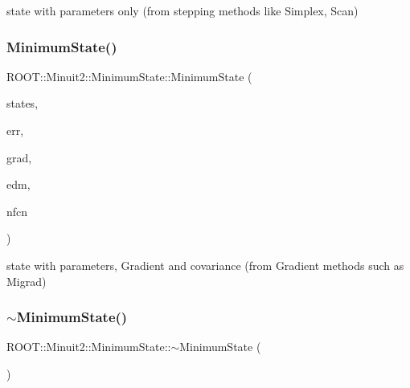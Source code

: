 state with parameters only (from stepping methods like Simplex, Scan) \mbox{\label{classROOT_1_1Minuit2_1_1MinimumState_a35c2e0098d60a9caeee9e2c60093b5a9}} 
\subsubsection{\texorpdfstring{MinimumState()}{MinimumState()}\hspace{0.1cm}{\footnotesize\ttfamily [3/8]}}
{\footnotesize\ttfamily R\+O\+O\+T\+::\+Minuit2\+::\+Minimum\+State\+::\+Minimum\+State (\begin{DoxyParamCaption}\item[{const \mbox{\hyperlink{classROOT_1_1Minuit2_1_1MinimumParameters}{Minimum\+Parameters}} \&}]{states,  }\item[{const \mbox{\hyperlink{classROOT_1_1Minuit2_1_1MinimumError}{Minimum\+Error}} \&}]{err,  }\item[{const \mbox{\hyperlink{classROOT_1_1Minuit2_1_1FunctionGradient}{Function\+Gradient}} \&}]{grad,  }\item[{double}]{edm,  }\item[{int}]{nfcn }\end{DoxyParamCaption})\hspace{0.3cm}{\ttfamily [inline]}}

state with parameters, Gradient and covariance (from Gradient methods such as Migrad) \mbox{\label{classROOT_1_1Minuit2_1_1MinimumState_a30666c7113d7e8c199d4de1b1a44ee03}} 
\subsubsection{\texorpdfstring{$\sim$MinimumState()}{~MinimumState()}\hspace{0.1cm}{\footnotesize\ttfamily [1/2]}}
{\footnotesize\ttfamily R\+O\+O\+T\+::\+Minuit2\+::\+Minimum\+State\+::$\sim$\+Minimum\+State (\begin{DoxyParamCaption}{ }\end{DoxyParamCaption})\hspace{0.3cm}{\ttfamily [inline]}}

